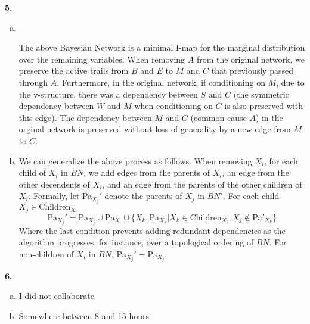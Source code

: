 \documentclass{article}
\begin{document}
\textbf{5.} \begin{enumerate}[(a)]
    \item \textcolor{white}{{s}}\begin{center}
    \end{center}
    The above Bayesian Network is a minimal I-map for the marginal distribution over the remaining variables. When removing $A$ from the original network, we preserve the active trails from $B$ and $E$ to $M$ and $C$ that previously passed through $A$. Furthermore, in the original network, if conditioning on $M$, due to the v-structure, there was a dependency between $S$ and $C$ (the symmetric dependency between $W$ and $M$ when conditioning on $C$ is also preserved with this edge). The dependency between $M$ and $C$ (common cause $A$) in the orginal network is preserved without loss of generality by a new edge from $M$ to $C$. 
    \item We can generalize the above process as follows. When removing $X_i$, for each child of $X_i$ in $BN$, we add edges from the parents of $X_i$, an edge from the other decendents of $X_i$, and an edge from the parents of the other children of $X_i$. Formally, let Pa$_{X_j}'$ denote the parents of $X_j$ in $BN'$. For each child $X_j \in \text{Children}_{X_i}$ \begin{equation*}
        \text{Pa}_{X_j}' = \text{Pa}_{X_j} \cup \text{Pa}_{X_i} \cup \{X_k, \text{Pa}_{X_k} | X_k \in \text{Children}_{X_i}, X_j \notin \text{Pa}'_{X_k}\}
    \end{equation*}
    Where the last condition prevents adding redundant dependencies as the algorithm progresses, for instance, over a topological ordering of $BN$. For non-children of $X_i$ in $BN$, $\text{Pa}_{X_j}' = \text{Pa}_{X_j}$. 
\end{enumerate}
\textbf{6.} \begin{enumerate}[(a)]
    \item I did not collaborate 
    \item Somewhere between 8 and 15 hours
\end{enumerate}
\end{document}
